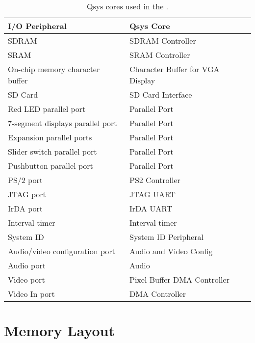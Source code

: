 \begin{table}[h]
    \begin{center}
    \begin{tabular}{l|l}
            \textbf{I/O Peripheral}
            & \textbf{Qsys Core}
        \\\hline
            SDRAM
            & SDRAM Controller
        \\
            SRAM
        &   SRAM Controller
        \\
            On-chip memory character buffer
				& Character Buffer for VGA Display
        \\
            SD Card
        &   SD Card Interface
        \\
            Red LED parallel port
				& Parallel Port
        \\
            7-segment displays parallel port
				& Parallel Port
        \\
            Expansion parallel ports
				& Parallel Port
        \\
            Slider switch parallel port
				& Parallel Port
        \\
            Pushbutton parallel port
				& Parallel Port
        \\
            PS/2 port
				& PS2 Controller
        \\
            JTAG port
				& JTAG UART
        \\
            IrDA port
				& IrDA UART
        \\
            Interval timer
				& Interval timer 
        \\
            System ID
				& System ID Peripheral
        \\
            Audio/video configuration port
				& Audio and Video Config
        \\
            Audio port
				& Audio
        \\
            Video port
				& Pixel Buffer DMA Controller
        \\
            Video In port
				& DMA Controller
        \\
    \end{tabular}
    \caption{Qsys cores used in the \systemName.}
    \label{tab:sopcnames}
    \end{center}
\end{table}



\section{Memory Layout}

